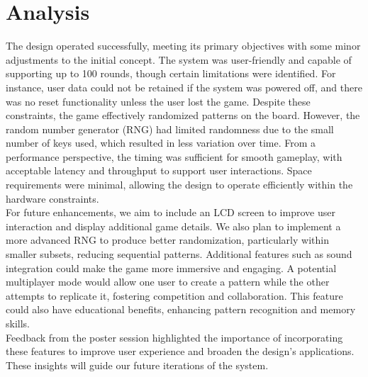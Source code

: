\documentclass{report}
\begin{document}
\chapter{Analysis}
The design operated successfully, meeting its primary objectives with some minor adjustments to the initial concept. The system was user-friendly and capable of supporting up to 100 rounds, though certain limitations were identified. For instance, user data could not be retained if the system was powered off, and there was no reset functionality unless the user lost the game. Despite these constraints, the game effectively randomized patterns on the board. However, the random number generator (RNG) had limited randomness due to the small number of keys used, which resulted in less variation over time. \newline \newline
From a performance perspective, the timing was sufficient for smooth gameplay, with acceptable latency and throughput to support user interactions. Space requirements were minimal, allowing the design to operate efficiently within the hardware constraints. \\\newline
For future enhancements, we aim to include an LCD screen to improve user interaction and display additional game details. We also plan to implement a more advanced RNG to produce better randomization, particularly within smaller subsets, reducing sequential patterns. Additional features such as sound integration could make the game more immersive and engaging. A potential multiplayer mode would allow one user to create a pattern while the other attempts to replicate it, fostering competition and collaboration. This feature could also have educational benefits, enhancing pattern recognition and memory skills.\\ \newline
Feedback from the poster session highlighted the importance of incorporating these features to improve user experience and broaden the design's applications. These insights will guide our future iterations of the system.
\end{document}
